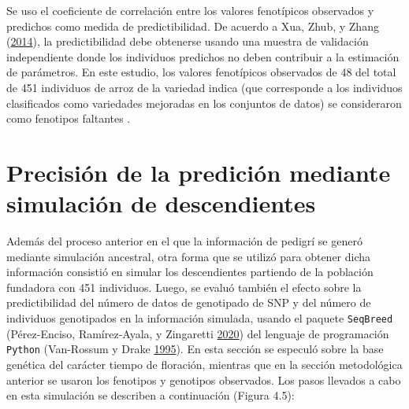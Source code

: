 \documentclass[11pt,spanish,a4paper,oneside,]{book} %
\begin{document}
Se uso el coeficiente de correlación entre los valores fenotípicos observados y predichos como medida de predictibilidad. De acuerdo a Xua, Zhub, y Zhang (\protect\hyperlink{ref-cite:25}{2014}), la predictibilidad debe obtenerse usando una muestra de validación independiente donde los individuos predichos no deben contribuir a la estimación de parámetros. En este estudio, los valores fenotípicos observados de 48 del total de 451 individuos de arroz de la variedad indica (que corresponde a los individuos clasificados como variedades mejoradas en los conjuntos de datos) se consideraron como fenotipos faltantes .

\hypertarget{precisiuxf3n-de-la-prediciuxf3n-mediante-simulaciuxf3n-de-descendientes}{%
\section{Precisión de la predición mediante simulación de descendientes}\label{precisiuxf3n-de-la-prediciuxf3n-mediante-simulaciuxf3n-de-descendientes}}

Además del proceso anterior en el que la información de pedigrí se generó mediante simulación ancestral, otra forma que se utilizó para obtener dicha información consistió en simular los descendientes partiendo de la población fundadora con 451 individuos. Luego, se evaluó también el efecto sobre la predictibilidad del número de datos de genotipado de SNP y del número de individuos genotipados en la información simulada, usando el paquete \texttt{SeqBreed} (Pérez-Enciso, Ramírez-Ayala, y Zingaretti \protect\hyperlink{ref-cite:47}{2020}) del lenguaje de programación \texttt{Python} (Van-Rossum y Drake \protect\hyperlink{ref-cite:53}{1995}). En esta sección se especuló sobre la base genética del carácter tiempo de floración, mientras que en la sección metodológica anterior se usaron los fenotipos y genotipos observados. Los pasos llevados a cabo en esta simulación se describen a continuación (Figura 4.5):
\end{document}
